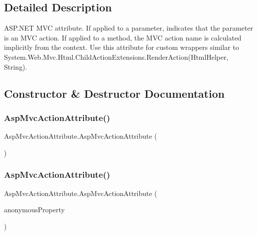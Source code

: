 \subsection{Detailed Description}
A\+S\+P.\+N\+ET M\+VC attribute. If applied to a parameter, indicates that the parameter is an M\+VC action. If applied to a method, the M\+VC action name is calculated implicitly from the context. Use this attribute for custom wrappers similar to {\ttfamily System.\+Web.\+Mvc.\+Html.\+Child\+Action\+Extensions.\+Render\+Action(\+Html\+Helper, String)}. 



\subsection{Constructor \& Destructor Documentation}
\mbox{\label{class_asp_mvc_action_attribute_a252bc1d3d3db3cae55317ccccbfb0923}} 
\subsubsection{\texorpdfstring{Asp\+Mvc\+Action\+Attribute()}{AspMvcActionAttribute()}\hspace{0.1cm}{\footnotesize\ttfamily [1/2]}}
{\footnotesize\ttfamily Asp\+Mvc\+Action\+Attribute.\+Asp\+Mvc\+Action\+Attribute (\begin{DoxyParamCaption}{ }\end{DoxyParamCaption})}

\mbox{\label{class_asp_mvc_action_attribute_af335bf9a97d8ae88f73337f3e7b70045}} 
\subsubsection{\texorpdfstring{Asp\+Mvc\+Action\+Attribute()}{AspMvcActionAttribute()}\hspace{0.1cm}{\footnotesize\ttfamily [2/2]}}
{\footnotesize\ttfamily Asp\+Mvc\+Action\+Attribute.\+Asp\+Mvc\+Action\+Attribute (\begin{DoxyParamCaption}\item[{\mbox{[}\+Not\+Null\mbox{]} string}]{anonymous\+Property }\end{DoxyParamCaption})}



